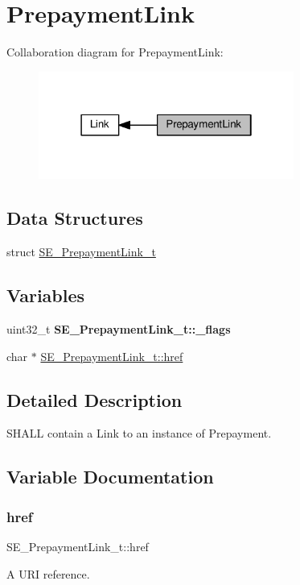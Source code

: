 \hypertarget{group__PrepaymentLink}{}\section{Prepayment\+Link}
\label{group__PrepaymentLink}
Collaboration diagram for Prepayment\+Link\+:\nopagebreak
\begin{figure}[H]
\begin{center}
\leavevmode
\includegraphics[width=238pt]{group__PrepaymentLink}
\end{center}
\end{figure}
\subsection*{Data Structures}
\begin{DoxyCompactItemize}
\item 
struct \hyperlink{structSE__PrepaymentLink__t}{S\+E\+\_\+\+Prepayment\+Link\+\_\+t}
\end{DoxyCompactItemize}
\subsection*{Variables}
\begin{DoxyCompactItemize}
\item 
\mbox{\label{group__PrepaymentLink_ga8b9ceabb2e25e862350b5097761c77ba}} 
uint32\+\_\+t {\bfseries S\+E\+\_\+\+Prepayment\+Link\+\_\+t\+::\+\_\+flags}
\item 
char $\ast$ \hyperlink{group__PrepaymentLink_ga0d4b57397c413bffec0e87b14a522afb}{S\+E\+\_\+\+Prepayment\+Link\+\_\+t\+::href}
\end{DoxyCompactItemize}


\subsection{Detailed Description}
S\+H\+A\+LL contain a Link to an instance of Prepayment. 

\subsection{Variable Documentation}
\mbox{\label{group__PrepaymentLink_ga0d4b57397c413bffec0e87b14a522afb}} 
\subsubsection{\texorpdfstring{href}{href}}
{\footnotesize\ttfamily S\+E\+\_\+\+Prepayment\+Link\+\_\+t\+::href}

A U\+RI reference. 